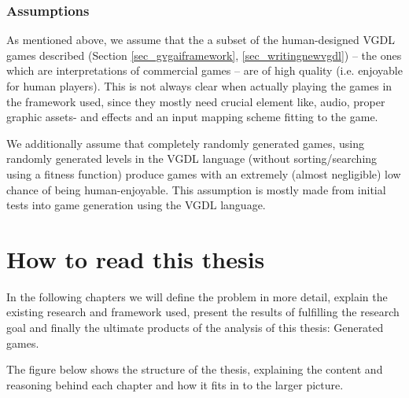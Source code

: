 \documentclass[a4paper,titlepage,final]{report}
\begin{document}
\subsubsection*{Assumptions}
As mentioned above, we assume that the a subset of the human-designed VGDL games described (Section \ref{sec_gvgaiframework}, \ref{sec_writingnewvgdl}) -- the ones which are interpretations of commercial games -- are of high quality (i.e. enjoyable for human players). 
This is not always clear when actually playing the games in the framework used, since they mostly need crucial element like, audio, proper graphic assets- and effects and an input mapping scheme fitting to the game.

We additionally assume that completely randomly generated games, using randomly generated levels in the VGDL language (without sorting/searching using a fitness function) produce games with an extremely (almost negligible) low chance of being human-enjoyable.
This assumption is mostly made from initial tests into game generation using the VGDL language.


\section{How to read this thesis}
\label{sec_howtoread}
In the following chapters we will define the problem in more detail, explain the existing research and framework used, present the results of fulfilling the research goal and finally the ultimate products of the analysis of this thesis: Generated games.

The figure below shows the structure of the thesis, explaining the content and reasoning behind each chapter and how it fits in to the larger picture.
\end{document}
